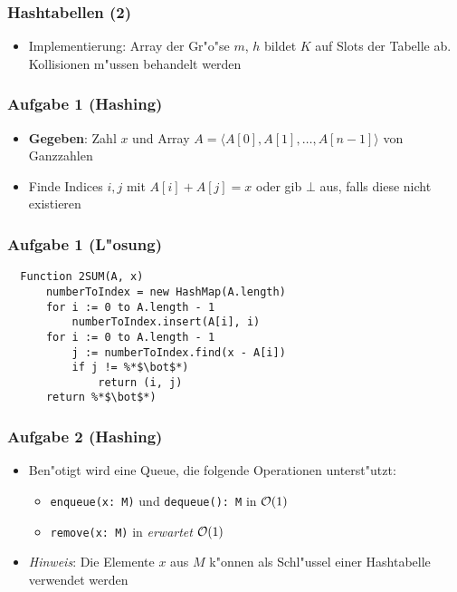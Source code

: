 \begin{frame}
  \frametitle{Hashtabellen (2)}
  \begin{itemize}
  \item Implementierung: Array der Gr"o"se $m$, $h$ bildet $K$ auf Slots der
        Tabelle ab. Kollisionen m"ussen behandelt werden
    \begin{itemize}
    \end{itemize}
  \end{itemize}
\end{frame}

\begin{frame}
  \frametitle{Aufgabe 1 (Hashing)}
  \begin{itemize}
  \item \textbf{Gegeben}: Zahl $x$ und Array $A = \langle A[0], A[1], \ldots, A[n-1] \rangle$
        von Ganzzahlen
  \item Finde Indices $i, j$ mit $A[i] + A[j] = x$ oder gib $\bot$ aus, falls
        diese nicht existieren
  \end{itemize}
\end{frame}

\begin{frame}[fragile]
  \frametitle{Aufgabe 1 (L"osung)}
  \begin{lstlisting}
  Function 2SUM(A, x)
      numberToIndex = new HashMap(A.length)
      for i := 0 to A.length - 1
          numberToIndex.insert(A[i], i)
      for i := 0 to A.length - 1
          j := numberToIndex.find(x - A[i])
          if j != %*$\bot$*)
              return (i, j)
      return %*$\bot$*)
  \end{lstlisting}
\end{frame}

\begin{frame}
  \frametitle{Aufgabe 2 (Hashing)}
  \begin{itemize}
  \item Ben"otigt wird eine Queue, die folgende Operationen unterst"utzt:
    \begin{itemize}
    \item \lstinline|enqueue(x: M)| und \lstinline|dequeue(): M| in $\mathcal{O}(1)$
    \item \lstinline|remove(x: M)| in \emph{erwartet} $\mathcal{O}(1)$
    \end{itemize}
  \item \emph{Hinweis}: Die Elemente $x$ aus $M$ k"onnen als Schl"ussel einer
        Hashtabelle verwendet werden
  \end{itemize}
\end{frame}

